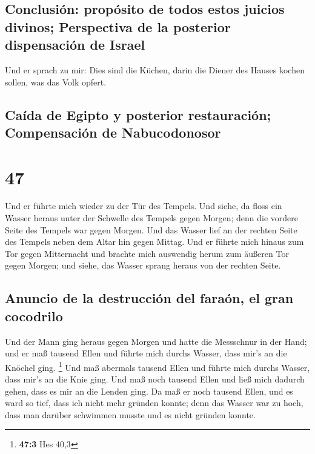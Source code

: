\hypertarget{conclusiuxf3n-propuxf3sito-de-todos-estos-juicios-divinos-perspectiva-de-la-posterior-dispensaciuxf3n-de-israel}{%
\subsection{Conclusión: propósito de todos estos juicios divinos;
Perspectiva de la posterior dispensación de
Israel}\label{conclusiuxf3n-propuxf3sito-de-todos-estos-juicios-divinos-perspectiva-de-la-posterior-dispensaciuxf3n-de-israel}}

 Und er sprach zu mir: Dies sind die Küchen, darin die
Diener des Hauses kochen sollen, was das Volk opfert.

\hypertarget{cauxedda-de-egipto-y-posterior-restauraciuxf3n-compensaciuxf3n-de-nabucodonosor}{%
\subsection{Caída de Egipto y posterior restauración; Compensación de
Nabucodonosor}\label{cauxedda-de-egipto-y-posterior-restauraciuxf3n-compensaciuxf3n-de-nabucodonosor}}

\hypertarget{section-46}{%
\section{47}\label{section-46}}

 Und er führte mich wieder zu der Tür des Tempels. Und
siehe, da floss ein Wasser heraus unter der Schwelle des Tempels gegen
Morgen; denn die vordere Seite des Tempels war gegen Morgen. Und das
Wasser lief an der rechten Seite des Tempels neben dem Altar hin gegen
Mittag.  Und er führte mich hinaus zum Tor gegen
Mitternacht und brachte mich auswendig herum zum äußeren Tor gegen
Morgen; und siehe, das Wasser sprang heraus von der rechten Seite.

\hypertarget{anuncio-de-la-destrucciuxf3n-del-farauxf3n-el-gran-cocodrilo}{%
\subsection{Anuncio de la destrucción del faraón, el gran
cocodrilo}\label{anuncio-de-la-destrucciuxf3n-del-farauxf3n-el-gran-cocodrilo}}

 Und der Mann ging heraus gegen Morgen und hatte die
Messschnur in der Hand; und er maß tausend Ellen und führte mich durchs
Wasser, dass mir's an die Knöchel ging. \footnote{\textbf{47:3} Hes 40,3}
 Und maß abermals tausend Ellen und führte mich durchs
Wasser, dass mir's an die Knie ging. Und maß noch tausend Ellen und ließ
mich dadurch gehen, dass es mir an die Lenden ging.  Da
maß er noch tausend Ellen, und es ward so tief, dass ich nicht mehr
gründen konnte; denn das Wasser war zu hoch, dass man darüber schwimmen
musste und es nicht gründen konnte.

